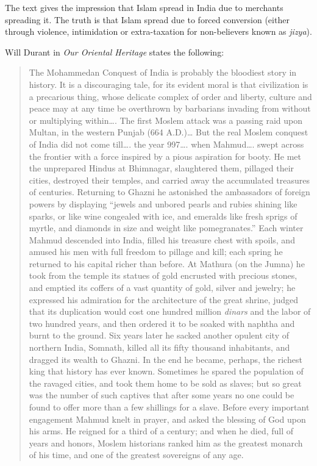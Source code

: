 The text gives the impression that Islam spread in India due to merchants spreading it. The truth is that Islam spread due to forced conversion (either through violence, intimidation or extra-taxation for non-believers known as \textit{jizya}). 

Will Durant in \textit{Our Oriental Heritage} states the following:
\begin{quotation}
\noindent The Mohammedan Conquest of India is probably the bloodiest story in history. It is a discouraging tale, for its evident moral is that civilization is a precarious thing, whose delicate complex of order and liberty, culture and peace may at any time be overthrown by barbarians invading from without or multiplying within…. The first Moslem attack was a passing raid upon Multan, in the western Punjab (664 A.D.)… But the real Moslem conquest of India did not come till…. the year 997…. when Mahmud…. swept across the frontier with a force inspired by a pious aspiration for booty. He met the unprepared Hindus at Bhimnagar, slaughtered them, pillaged their cities, destroyed their temples, and carried away the accumulated treasures of centuries. Returning to Ghazni he astonished the ambassadors of foreign powers by displaying “jewels and unbored pearls and rubies shining like sparks, or like wine congealed with ice, and emeralds like fresh sprigs of myrtle, and diamonds in size and weight like pomegranates.” Each winter Mahmud descended into India, filled his treasure chest with spoils, and amused his men with full freedom to pillage and kill; each spring he returned to his capital richer than before. At Mathura (on the Jumna) he took from the temple its statues of gold encrusted with precious stones, and emptied its coffers of a vast quantity of gold, silver and jewelry; he expressed his admiration for the architecture of the great shrine, judged that its duplication would cost one hundred million \textit{dinars} and the labor of two hundred years, and then ordered it to be soaked with naphtha and burnt to the ground. Six years later he sacked another opulent city of northern India, Somnath, killed all its fifty thousand inhabitants, and dragged its wealth to Ghazni. In the end he became, perhaps, the richest king that history has ever known. Sometimes he spared the population of the ravaged cities, and took them home to be sold as slaves; but so great was the number of such captives that after some years no one could be found to offer more than a few shillings for a slave. Before every important engagement Mahmud knelt in prayer, and asked the blessing of God upon his arms. He reigned for a third of a century; and when he died, full of years and honors, Moslem historians ranked him as the greatest monarch of his time, and one of the greatest sovereigns of any age.
\medskip


\end{quotation}
